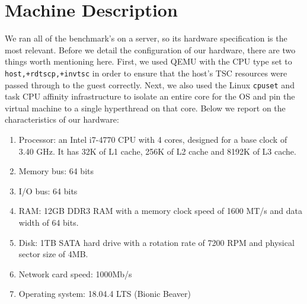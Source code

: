 \section{Machine Description}

We ran all of the benchmark's on a server, so its hardware
specification is the most relevant.  Before we detail the configuration of our hardware, there are two things worth mentioning here.
First, we used QEMU with the CPU type
set to \verb|host,+rdtscp,+invtsc| in order to ensure that the host's
TSC resources were passed through to the guest correctly. 
Next, we also
used the Linux \verb|cpuset| and task CPU affinity infrastructure to
isolate an entire core for the OS and pin the virtual machine to a
single hyperthread on that core.
Below we report on the characteristics of our hardware:
\begin{enumerate}
    \item Processor: an Intel i7-4770 CPU with 4 cores, designed for a base clock of 3.40 GHz. 
    It has 32K of L1 cache, 256K of L2 cache and 8192K of L3 cache.
    \item Memory bus: 64 bits
    \item I/O bus: 64 bits
    \item RAM: 12GB DDR3 RAM with a memory clock speed of 1600 MT/s and data width of 64 bits.
    \item Disk: 1TB SATA hard drive with a rotation rate of 7200 RPM and physical sector size of 4MB.
    \item Network card speed: 1000Mb/s
    \item Operating system: 18.04.4 LTS (Bionic Beaver)
\end{enumerate}
